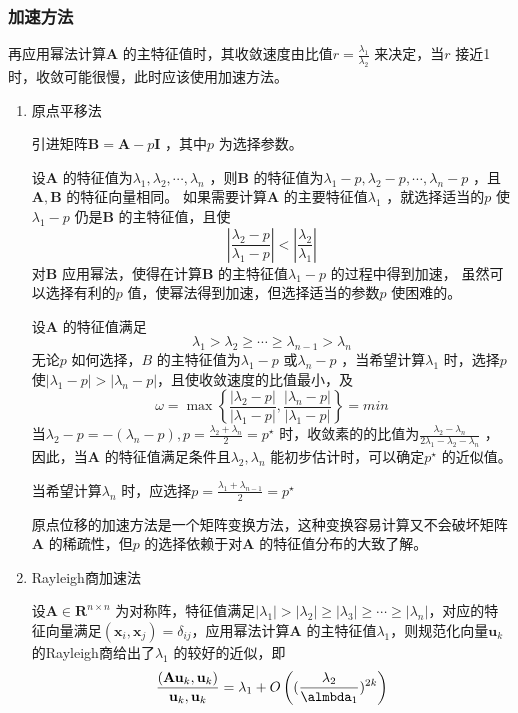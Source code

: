 \documentclass[a4paper]{article}
\begin{document}
\subsubsection{加速方法}
再应用幂法计算$\mathbf{A}$ 的主特征值时，其收敛速度由比值$r = \frac{\lambda_1}{\lambda_2}$ 来决定，当$r$ 接近1时，收敛可能很慢，此时应该使用加速方法。
\begin{enumerate}
	\item 原点平移法

		引进矩阵$\mathbf{B} = \mathbf{A} - p \mathbf{I}$ ，其中$p$ 为选择参数。

		设$\mathbf{A}$ 的特征值为$\lambda_1, \lambda_2, \cdots, \lambda_n$ ，则$\mathbf{B}$ 的特征值为$\lambda_1 - p, \lambda_2 - p, \cdots, \lambda_n - p$ ，且$\mathbf{A,B}$ 的特征向量相同。
		如果需要计算$\mathbf{A}$ 的主要特征值$\lambda_1$ ，就选择适当的$p$ 使$\lambda_1 - p$ 仍是$\mathbf{B}$ 的主特征值，且使
		\[
		\left| \frac{\lambda_2 - p}{\lambda_1 - p} \right| < \left| \frac{\lambda_2}{\lambda_1} \right| 
		\] 
		对$\mathbf{B}$ 应用幂法，使得在计算$\mathbf{B}$ 的主特征值$\lambda_1 - p$ 的过程中得到加速，
		虽然可以选择有利的$p$ 值，使幂法得到加速，但选择适当的参数$p$ 使困难的。

		设$\mathbf{A}$ 的特征值满足
		\[
			\lambda_1 > \lambda_2 \ge \cdots \ge \lambda_{n-1} > \lambda_n \tag{8.2.10} \label{eq:8.2.10} 
		\] 
		无论$p$ 如何选择，$B$ 的主特征值为$\lambda_1 - p$ 或$\lambda_n - p$ ，当希望计算$\lambda_1$ 时，选择$p$ 使$|\lambda_1 - p | > | \lambda_n - p|$，且使收敛速度的比值最小，及
		\[
		\omega = \max \left\{ \frac{|\lambda_2 - p|}{| \lambda_1 - p |}, \frac{| \lambda_n - p |}{| \lambda_1 - p |} \right\} = min
		\] 
		当$\lambda_2 - p = - (\lambda_n - p), p = \frac{\lambda_2 + \lambda_n}{2} = p^{\star}$ 时，收敛素的的比值为$\frac{\lambda_2 - \lambda_n}{2 \lambda_1 - \lambda_2 - \lambda_n}$ ，因此，当$\mathbf{A}$ 的特征值满足条件且$\lambda_2, \lambda_n$ 能初步估计时，可以确定$p^{\star}$ 的近似值。

		当希望计算$\lambda_n$ 时，应选择$p = \frac{\lambda_1 + \lambda_{n-1}}{2} = p^{\star}$
		
		原点位移的加速方法是一个矩阵变换方法，这种变换容易计算又不会破坏矩阵$\mathbf{A}$ 的稀疏性，但$p$ 的选择依赖于对$\mathbf{A}$ 的特征值分布的大致了解。
	\item Rayleigh商加速法

		\begin{theorem}
			设$\mathbf{A} \in \mathbf{R}^{n \times n}$ 为对称阵，特征值满足$|\lambda_1| > |\lambda_2| \ge |\lambda_3| \ge \cdots \ge |\lambda_n|$，对应的特征向量满足$(\mathbf{x}_i, \mathbf{x}_j) = \delta_{ij}$，应用幂法计算$\mathbf{A}$ 的主特征值$\lambda_1$，则规范化向量$\mathbf{u}_k$的Rayleigh商给出了$\lambda_1$ 的较好的近似，即
			\[
			\frac{(\mathbf{A u}_k, \mathbf{u}_k)}{\mathbf{u}_k, \mathbf{u}_k} = \lambda_1 + O\left( (\frac{\lambda_2}{\almbda_1})^{2k} \right) 
			\] 
		\end{theorem}
\end{enumerate}
\end{document}
